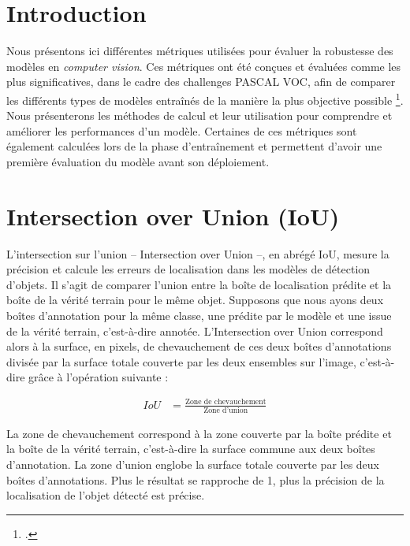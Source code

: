 \documentclass[12pt,twoside]{book}
\begin{document}
\section{Introduction}

Nous présentons ici différentes métriques utilisées pour évaluer la robustesse des modèles en \textit{computer vision}. Ces métriques ont été conçues et évaluées comme les plus significatives, dans le cadre des challenges PASCAL VOC, afin de comparer les différents types de modèles entraînés de la manière la plus objective possible \footcite{everingham_pascal_2010}.  Nous présenterons les méthodes de calcul et leur utilisation pour comprendre et améliorer les performances d’un modèle. Certaines de ces métriques sont également calculées lors de la phase d’entraînement et permettent d’avoir une première évaluation du modèle avant son déploiement.

\section{Intersection over Union (IoU)}

L'intersection sur l'union -- Intersection over Union --, en abrégé IoU, mesure la précision et calcule les erreurs de localisation dans les modèles de détection d'objets. Il s’agit de comparer l’union entre la boîte de localisation prédite et la boîte de la vérité terrain pour le même objet. Supposons que nous ayons deux boîtes d’annotation pour la même classe, une prédite par le modèle et une issue de la vérité terrain, c’est-à-dire annotée. L'Intersection over Union correspond alors à la surface, en pixels, de chevauchement de ces deux boîtes d’annotations divisée par la surface totale couverte par les deux ensembles sur l'image, c’est-à-dire grâce à l’opération suivante : 

\newpage
\begin{center}
\begin{align*}
    IoU &= \frac{\text{Zone de chevauchement}}{\text{Zone d'union}}
\end{align*}
\end{center}

La zone de chevauchement correspond à la zone couverte par la boîte prédite et la boîte de la vérité terrain, c’est-à-dire la surface commune aux deux boîtes d’annotation. La zone d’union englobe la surface totale couverte par les deux boîtes d’annotations. Plus le résultat se rapproche de 1, plus la précision de la localisation de l’objet détecté est précise.
\end{document}
